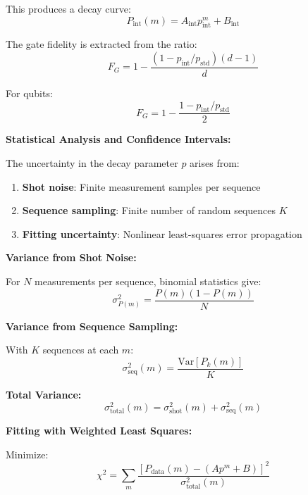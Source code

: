 \documentclass[11pt,a4paper]{article}
\theoremstyle{definition}
\theoremstyle{remark}
\begin{document}
This produces a decay curve:
\begin{equation}
P_{\text{int}}(m) = A_{\text{int}} p_{\text{int}}^m + B_{\text{int}}
\end{equation}

The gate fidelity is extracted from the ratio:
\begin{equation}
F_G = 1 - \frac{(1 - p_{\text{int}}/p_{\text{std}})(d-1)}{d}
\end{equation}

For qubits:
\begin{equation}
F_G = 1 - \frac{1 - p_{\text{int}}/p_{\text{std}}}{2}
\end{equation}

\textbf{Statistical Analysis and Confidence Intervals:}

The uncertainty in the decay parameter $p$ arises from:
\begin{enumerate}
    \item \textbf{Shot noise}: Finite measurement samples per sequence
    \item \textbf{Sequence sampling}: Finite number of random sequences $K$
    \item \textbf{Fitting uncertainty}: Nonlinear least-squares error propagation
\end{enumerate}

\textbf{Variance from Shot Noise:}

For $N$ measurements per sequence, binomial statistics give:
\begin{equation}
\sigma^2_{P(m)} = \frac{P(m)(1-P(m))}{N}
\end{equation}

\textbf{Variance from Sequence Sampling:}

With $K$ sequences at each $m$:
\begin{equation}
\sigma^2_{\text{seq}}(m) = \frac{\text{Var}[P_k(m)]}{K}
\end{equation}

\textbf{Total Variance:}
\begin{equation}
\sigma^2_{\text{total}}(m) = \sigma^2_{\text{shot}}(m) + \sigma^2_{\text{seq}}(m)
\end{equation}

\textbf{Fitting with Weighted Least Squares:}

Minimize:
\begin{equation}
\chi^2 = \sum_m \frac{[P_{\text{data}}(m) - (Ap^m + B)]^2}{\sigma^2_{\text{total}}(m)}
\end{equation}
\end{document}
